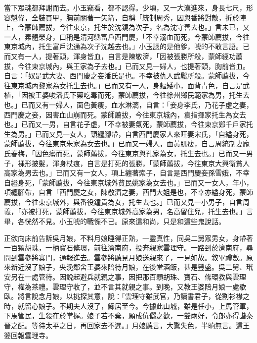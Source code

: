 當下眾魂都拜謝而去。小玉竊看，都不認得。少頃，又一大漢進來，身長七尺，形容魁偉，全裝貫甲，胸前關著一矢箭，自稱「統制周秀，因與番將對敵，折於陣上，今蒙師薦拔，今往東京，托生於沈鏡為次子，名為沈守善去也。」言未已，又一人，素體榮身，口稱是清河縣富戶西門慶，「不幸溺血而死，今蒙師薦拔，今往東京城內，托生富戶沈通為次子沈越去也。」小玉認的是他爹，唬的不敢言語。已而又有一人，提著頭，渾身皆血，自言是陳敬濟，「因被張勝所殺，蒙師經功薦拔，今往東京城內，與王家為子去也。」已而又見一婦人，也提著頭，胸前皆血。自言：「奴是武大妻、西門慶之妾潘氏是也。不幸被仇人武鬆所殺。蒙師薦拔，今往東京城內黎家為女托生去也。」已而又有一人，身軀矮小，面背青色，自言是武植，「因被王婆唆潘氏下藥吃毒而死，蒙師薦拔，今往徐州鄉民範家為男，托生去也。」已而又有一婦人，面色黃瘦，血水淋漓，自言：「妾身李氏，乃花子虛之妻，西門慶之妾，因害血山崩而死。蒙師薦拔，今往東京城內，袁指揮家托生為女去也。」已而又一男，自言花子虛，「不幸被妻氣死，蒙師薦拔，今往東京鄭千戶家托生為男。」已而又見一女人，頸纏腳帶，自言西門慶家人來旺妻宋氏，「自縊身死，蒙師薦拔，今往東京朱家為女去也。」已而又一婦人，面黃肌瘦，自言周統制妻龐氏春梅，「因色癆而死，蒙師薦拔，今往東京與孔家為女，托生去也。」已而又一男子，裸形披髮，渾身杖痕，自言是打死的張勝，「蒙師薦拔，今往東京大興衛貧人高家為男去也。」已而又有一女人，項上纏著索子，自言是西門慶妾孫雪娥，不幸自縊身死，「蒙師薦拔，今往東京城外貧民姚家為女去也。」已而又一女人，年小，項纏腳帶，自言「西門慶之女，陳敬濟之妻，西門大姐是也，不幸亦縊身死，蒙師薦拔，今往東京城外，與番役鐘貴為女，托生去也。」已而又見一小男子，自言周義，「亦被打死，蒙師薦拔，今往東京城外高家為男，名高留住兒，托生去也。」言畢，各恍然不見。小玉唬的戰慄不已。原來這和尚，只是和這些鬼說話。

正欲向床前告訴吳月娘，不料月娘睡得正熟，一靈真性，同吳二舅眾男女，身帶著一百顆胡珠，一柄寶石絛環，前往濟南府，投奔親家雲理守。一路到於濟南府，尋問到雲參將寨門，通報進去。雲參將聽見月娘送親來了，一見如故。敘畢禮數。原來新近沒了娘子，央浼鄰舍王婆來陪待月娘，在後堂酒飯，甚是豐盛。吳二舅、玳安另在一處管待。因說起避兵就親之事，因把那百顆胡珠、寶石、絛環教與雲理守，權為茶禮。雲理守收了，並不言其就親之事。到晚，又教王婆陪月娘一處歇臥。將言說念月娘，以挑探其意，說：「雲理守雖武官，乃讀書君子，從割衫襟之時，就留心娘子。不期夫人沒了，鰥居至今。今據此山城，雖是任小，上馬管軍，下馬管民，生殺在於掌握。娘子若不棄，願成伉儷之歡，一雙兩好，令郎亦得諧秦晉之配。等待太平之日，再回家去不遲。」月娘聽言，大驚失色，半晌無言。這王婆回報雲理寺。

